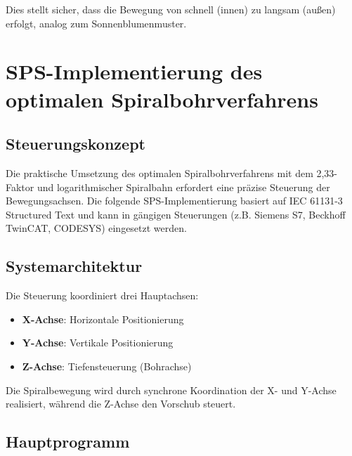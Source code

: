 ﻿\documentclass[12pt,a4paper]{article}
\begin{document}
Dies stellt sicher, dass die Bewegung von schnell (innen) zu langsam (außen) erfolgt, analog zum Sonnenblumenmuster.

\section{SPS-Implementierung des optimalen Spiralbohrverfahrens}

\subsection{Steuerungskonzept}

Die praktische Umsetzung des optimalen Spiralbohrverfahrens mit dem 2,33-Faktor und logarithmischer Spiralbahn erfordert eine präzise Steuerung der Bewegungsachsen. Die folgende SPS-Implementierung basiert auf IEC 61131-3 Structured Text und kann in gängigen Steuerungen (z.B. Siemens S7, Beckhoff TwinCAT, CODESYS) eingesetzt werden.

\subsection{Systemarchitektur}

Die Steuerung koordiniert drei Hauptachsen:
\begin{itemize}
	\item \textbf{X-Achse}: Horizontale Positionierung
	\item \textbf{Y-Achse}: Vertikale Positionierung
	\item \textbf{Z-Achse}: Tiefensteuerung (Bohrachse)
\end{itemize}

Die Spiralbewegung wird durch synchrone Koordination der X- und Y-Achse realisiert, während die Z-Achse den Vorschub steuert.

\subsection{Hauptprogramm}
\end{document}
